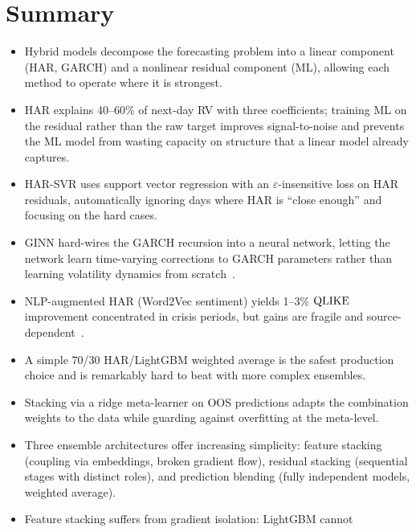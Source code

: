 \section{Summary}\label{sec:hybrid:summary}

\begin{itemize}
  \item Hybrid models decompose the forecasting problem into a linear
        component (HAR, GARCH) and a nonlinear residual component (ML),
        allowing each method to operate where it is strongest.
  \item HAR explains 40--60\% of next-day RV with three coefficients;
        training ML on the residual rather than the raw target improves
        signal-to-noise and prevents the ML model from wasting capacity
        on structure that a linear model already captures.
  \item HAR-SVR uses support vector regression with an
        $\varepsilon$-insensitive loss on HAR residuals, automatically
        ignoring days where HAR is ``close enough'' and focusing on the
        hard cases.
  \item GINN hard-wires the GARCH recursion into a neural network, letting
        the network learn time-varying corrections to GARCH parameters
        rather than learning volatility dynamics from
        scratch~\citep{GINN2024}.
  \item NLP-augmented HAR (Word2Vec sentiment) yields 1--3\% $\operatorname{QLIKE}$
        improvement concentrated in crisis periods, but gains are fragile
        and source-dependent~\citep{RahimikiaZohrenPoon2021NLP}.
  \item A simple 70/30 HAR/LightGBM weighted average is the safest
        production choice and is remarkably hard to beat with more
        complex ensembles.
  \item Stacking via a ridge meta-learner on OOS predictions adapts the
        combination weights to the data while guarding against overfitting
        at the meta-level.
  \item Three ensemble architectures offer increasing simplicity:
        feature stacking (coupling via embeddings, broken gradient flow),
        residual stacking (sequential stages with distinct roles), and
        prediction blending (fully independent models, weighted average).
  \item Feature stacking suffers from gradient isolation: LightGBM cannot

\end{itemize}
